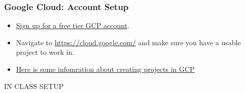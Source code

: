 \documentclass[aspectratio=169]{beamer}
\begin{document}
\begin{frame}
	\frametitle{Google Cloud: Account Setup}
	\begin{itemize}
		\item \href{https://cloud.google.com/free}{Sign up for a free tier GCP account}.
		\item Navigate to \href{https://cloud.google.com/}{https://cloud.google.com/} and make sure you have a usable project to work in.
		\item \href{https://cloud.google.com/resource-manager/docs/creating-managing-projects}{Here is some infomration about creating projects in GCP}
	\end{itemize}
\end{frame}


\begin{frame}
	\Huge \textcolor{dgreen}{IN CLASS SETUP}
\end{frame}
                                                                          
\end{document}
